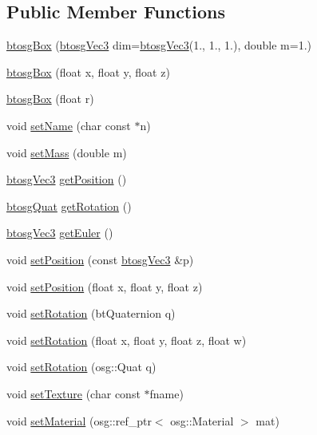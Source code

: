 \subsection*{Public Member Functions}
\begin{DoxyCompactItemize}
\item 
\hyperlink{classbtosgBox_aaffbdeeac3ee040dea98c19b538f0e49}{btosg\+Box} (\hyperlink{classbtosgVec3}{btosg\+Vec3} dim=\hyperlink{classbtosgVec3}{btosg\+Vec3}(1., 1., 1.), double m=1.)
\item 
\hyperlink{classbtosgBox_a0b7809cf498d50ced7c6e4a1bf0f5470}{btosg\+Box} (float x, float y, float z)
\item 
\hyperlink{classbtosgBox_a3b17e84e3f94aabdc7b8517bd802a5c9}{btosg\+Box} (float r)
\item 
void \hyperlink{classbtosgObject_ab06a1b3f357209214c6440cd5746523e}{set\+Name} (char const $\ast$n)
\item 
void \hyperlink{classbtosgObject_a91da93c82d48b86192f0cbb16054fe57}{set\+Mass} (double m)
\item 
\hyperlink{classbtosgVec3}{btosg\+Vec3} \hyperlink{classbtosgObject_a3dadd5da8f2a312e44a039446b93d4cd}{get\+Position} ()
\item 
\hyperlink{classbtosgQuat}{btosg\+Quat} \hyperlink{classbtosgObject_a3b825999ad3a51bde743d4085ff19dae}{get\+Rotation} ()
\item 
\hyperlink{classbtosgVec3}{btosg\+Vec3} \hyperlink{classbtosgObject_a2019ec63bde02b72600450c7c985e77a}{get\+Euler} ()
\item 
void \hyperlink{classbtosgObject_ace6b51040b7ddce90818174200cc6074}{set\+Position} (const \hyperlink{classbtosgVec3}{btosg\+Vec3} \&p)
\item 
void \hyperlink{classbtosgObject_adb9f2cff0faf66dc252cd7c97b11ac84}{set\+Position} (float x, float y, float z)
\item 
void \hyperlink{classbtosgObject_a656412794a971a10478aedb520f298bf}{set\+Rotation} (bt\+Quaternion q)
\item 
void \hyperlink{classbtosgObject_a4d21ca59b944fd26644db35d3e9ba67a}{set\+Rotation} (float x, float y, float z, float w)
\item 
void \hyperlink{classbtosgObject_ae803e0566f0d7b3ffca686b968b297f8}{set\+Rotation} (osg\+::\+Quat q)
\item 
void \hyperlink{classbtosgObject_aff54acbc7c66811efb0cf2838107a241}{set\+Texture} (char const $\ast$fname)
\item 
void \hyperlink{classbtosgObject_a6ab7b9e0553dab398b980637788b56a8}{set\+Material} (osg\+::ref\+\_\+ptr$<$ osg\+::\+Material $>$ mat)

\end{DoxyCompactItemize}
